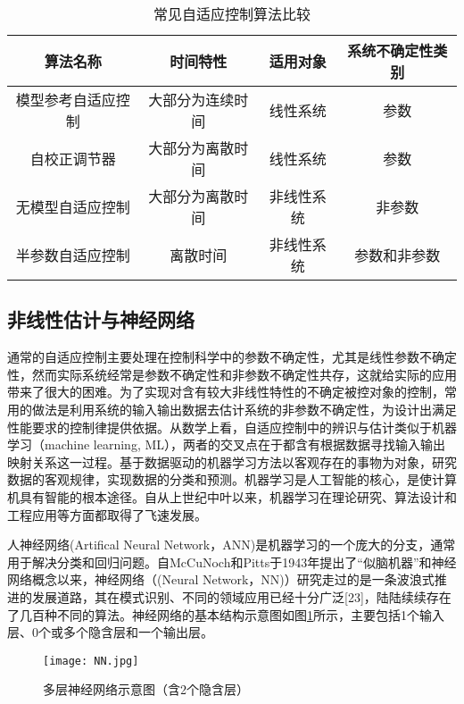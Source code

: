 \begin{table}
\centering
\caption{常见自适应控制算法比较}\label{tab:adaptive}
\begin{tabular*}{0.9\textwidth}{@{\extracolsep{\fill}}cccc}
\toprule
算法名称		&时间特性	&适用对象	&系统不确定性类别 \\
\midrule
模型参考自适应控制		&大部分为连续时间	&线性系统&参数\\
自校正调节器		&大部分为离散时间	& 线性系统&参数\\
无模型自适应控制		&大部分为离散时间	&非线性系统&非参数\\
半参数自适应控制		&离散时间&非线性系统	&参数和非参数\\
\bottomrule
\end{tabular*}
\end{table}

\subsection{非线性估计与神经网络}%

通常的自适应控制主要处理在控制科学中的参数不确定性，尤其是线性参数不确定性，然而实际系统经常是参数不确定性和非参数不确定性共存，这就给实际的应用带来了很大的困难。为了实现对含有较大非线性特性的不确定被控对象的控制，常用的做法是利用系统的输入输出数据去估计系统的非参数不确定性，为设计出满足性能要求的控制律提供依据。从数学上看，自适应控制中的辨识与估计类似于机器学习（machine learning, ML），两者的交叉点在于都含有根据数据寻找输入输出映射关系这一过程。基于数据驱动的机器学习方法以客观存在的事物为对象，研究数据的客观规律，实现数据的分类和预测。机器学习是人工智能的核心，是使计算机具有智能的根本途径。自从上世纪中叶以来，机器学习在理论研究、算法设计和工程应用等方面都取得了飞速发展。

人神经网络(Artifical Neural Network，ANN)是机器学习的一个庞大的分支，通常用于解决分类和回归问题。自McCuNoch和Pitts于1943年提出了“似脑机器”和神经网络概念以来，神经网络（(Neural Network，NN)）研究走过的是一条波浪式推进的发展道路，其在模式识别、不同的领域应用已经十分广泛[23]，陆陆续续存在了几百种不同的算法。神经网络的基本结构示意图如图\ref{fig:MNN}所示，主要包括1个输入层、0个或多个隐含层和一个输出层。

\begin{figure}
 \centering
 \texttt{[image: NN.jpg]}
 \caption{多层神经网络示意图（含2个隐含层）}\label{fig:MNN}
\end{figure}

